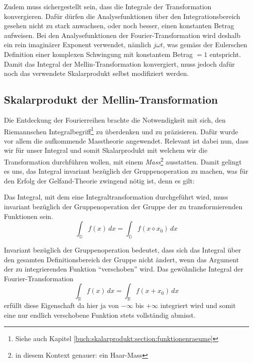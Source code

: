 Zudem muss sichergestellt sein, dass die Integrale der Transformation 
konvergieren.
Dafür dürfen die Analysefunktionen über den Integrationsbereich 
gesehen nicht zu stark anwachsen, oder noch besser, einen konstanten 
Betrag aufweisen. 
Bei den Analysefunktionen der Fourier-Transformation wird deshalb 
ein rein imaginärer Exponent verwendet, nämlich $j\omega t$, was 
gemäss der Eulerschen Definition einer komplexen Schwingung mit 
konstantem Betrag $= 1$ entspricht.
Damit das Integral der Mellin-Transformation konvergiert, muss jedoch 
dafür noch das verwendete Skalarprodukt selbst modifiziert werden.


\subsection{Skalarprodukt der Mellin-Transformation
\label{mellin:subsection:skalarprodukt}}
Die Entdeckung der Fourierreihen brachte die Notwendigkeit mit sich, 
den Riemannschen Integralbegriff\footnote{Siehe auch Kapitel 
\ref{buch:skalarprodukt:section:funktionenraeume}} zu überdenken und 
zu präzisieren.
Dafür wurde vor allem die aufkommende Masstheorie angewendet.
%
Relevant ist dabei nun, dass wir für unser Integral und somit 
Skalarprodukt mit welchem wir die Transformation durchführen wollen, 
mit einem {\em Mass}\footnote{in diesem Kontext genauer: ein Haar-Mass} 
%
ausstatten. 
Damit gelingt es uns, das Integral 
invariant bezüglich der Gruppenoperation zu machen, was für den 
Erfolg der Gelfand-Theorie zwingend nötig ist, denn es gilt:
\begin{definition}
    Das Integral, mit dem eine Integraltransformation durchgeführt 
    wird, muss invariant bezüglich der Gruppenoperation der Gruppe 
    der zu transformierenden Funktionen sein.
    \[
        \int_\mathbb{G} f(x)\,{d}x 
        = \int_\mathbb{G} f(x \diamond x_0)\,{d}x
    \]
\end{definition}
Invariant bezüglich der Gruppenoperation bedeutet, dass sich das 
Integral über den gesamten Definitionsbereich der Gruppe nicht ändert, 
wenn das Argument der zu integrierenden Funktion ``verschoben'' wird. 
Das gewöhnliche Integral der Fourier-Transformation 
\begin{equation}
    \int_\mathbb{R} f(x)\,{d}x 
    = \int_\mathbb{R} f(x + x_0)\,{d}x
\end{equation}
erfüllt diese Eigenschaft 
da hier ja von $-\infty$ bis $+\infty$ integriert wird und somit eine 
nur endlich verschobene Funktion stets vollständig abmisst.
